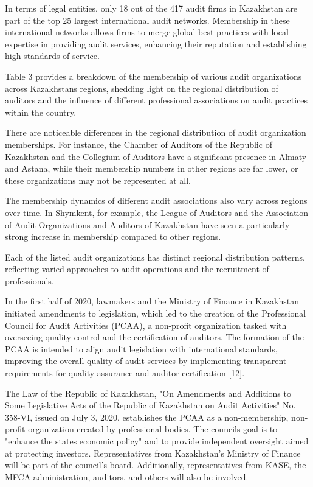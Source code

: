 \begin{multicols}{2}
In terms of legal entities, only 18 out of the 417 audit firms in
Kazakhstan are part of the top 25 largest international audit networks.
Membership in these international networks allows firms to merge global
best practices with local expertise in providing audit services,
enhancing their reputation and establishing high standards of service.

Table 3 provides a breakdown of the membership of various audit
organizations across Kazakhstan\textquotesingle s regions, shedding
light on the regional distribution of auditors and the influence of
different professional associations on audit practices within the
country.

There are noticeable differences in the regional distribution of audit
organization memberships. For instance, the Chamber of Auditors of the
Republic of Kazakhstan and the Collegium of Auditors have a significant
presence in Almaty and Astana, while their membership numbers in other
regions are far lower, or these organizations may not be represented at
all.

The membership dynamics of different audit associations also vary across
regions over time. In Shymkent, for example, the League of Auditors and
the Association of Audit Organizations and Auditors of Kazakhstan have
seen a particularly strong increase in membership compared to other
regions.


Each of the listed audit organizations has distinct regional
distribution patterns, reflecting varied approaches to audit operations
and the recruitment of professionals.

In the first half of 2020, lawmakers and the Ministry of Finance in
Kazakhstan initiated amendments to legislation, which led to the
creation of the Professional Council for Audit Activities (PCAA), a
non-profit organization tasked with overseeing quality control and the
certification of auditors. The formation of the PCAA is intended to
align audit legislation with international standards, improving the
overall quality of audit services by implementing transparent
requirements for quality assurance and auditor certification {[}12{]}.

The Law of the Republic of Kazakhstan, "On Amendments and Additions to
Some Legislative Acts of the Republic of Kazakhstan on Audit Activities"
No. 358-VI, issued on July 3, 2020, establishes the PCAA as a
non-membership, non-profit organization created by professional bodies.
The council\textquotesingle s goal is to "enhance the
state\textquotesingle s economic policy" and to provide independent
oversight aimed at protecting investors. Representatives from
Kazakhstan's Ministry of Finance will be part of the council's board.
Additionally, representatives from KASE, the MFCA administration,
auditors, and others will also be involved.
\end{multicols}

